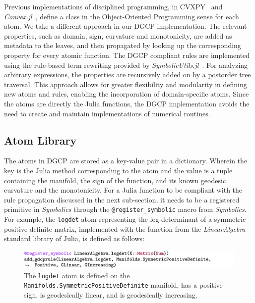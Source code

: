 \documentclass[twoside,11pt]{article}
\begin{document}
Previous implementations of disciplined programming, in CVXPY~\citep{diamond2016cvxpy} and \textsl{Convex.jl}~\citep{udell2014convex}, define a class in the Object-Oriented Programming %
sense for each atom. We take a different approach in our DGCP implementation. The relevant properties, such as domain, sign, curvature and monotonicity, are added as metadata to the leaves, and then propagated by looking up the corresponding property for every atomic function. The DGCP compliant rules are implemented using the rule-based term rewriting provided by \textsl{SymbolicUtils.jl}~\citep{symutils}. For analyzing arbitrary expressions, the properties are recursively added on by a postorder tree traversal. This approach allows for greater flexibility and modularity in defining new atoms and rules, enabling the incorporation of domain-specific atoms. Since the atoms are directly the Julia functions, the DGCP implementation avoids the need to create and maintain implementations of numerical routines.

\subsection{Atom Library}

The atoms in DGCP are stored as a key-value pair in a dictionary. Wherein the key is the Julia method corresponding to the atom and the value is a tuple containing the manifold, the sign of the function, and its known geodesic curvature and the monotonicity. For a Julia function to be compliant with the rule propagation discussed in the next sub-section, it needs to be a registered primitive in \textsl{Symbolics} through the \verb|@register_symbolic| macro from \textsl{Symbolics}.         
For example, the \texttt{logdet} atom representing the log-determinant of a symmetric positive definite matrix, implemented with the function from the \textsl{LinearAlgebra} standard library of Julia, is defined as follows:

\begin{figure}
    \centering
    \includegraphics[width=\linewidth]{listing/1.png}
    \caption{The \texttt{logdet} atom is defined on the \texttt{Manifolds.SymmetricPositiveDefinite} manifold, has a positive sign, is geodesically linear, and is geodesically increasing.}
    \label{logdetatom}
\end{figure}
\end{document}
